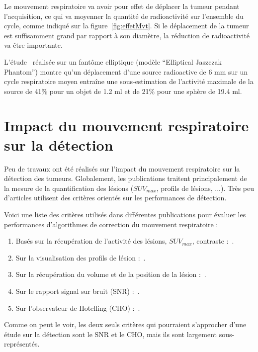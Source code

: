 Le mouvement respiratoire va avoir pour effet de déplacer la tumeur pendant l'acquisition, ce qui va moyenner la quantité de radioactivité sur l'ensemble du cycle, comme indiqué sur la figure~\ref{fig:effetMvt}. Si le déplacement de la tumeur est suffisamment grand par rapport à son diamètre, la réduction de radioactivité va être importante.

L'étude~\cite{boucher2004respiratory} réalisée sur un fantôme elliptique (modèle ``Elliptical Jaszczak Phantom'') montre qu'un déplacement d'une source radioactive de 6 mm sur un cycle respiratoire moyen entraîne une sous-estimation de l'activité maximale de la source de 41\% pour un objet de 1.2 ml et de 21\% pour une sphère de 19.4 ml.


\section{Impact du mouvement respiratoire sur la détection}

Peu de travaux ont été réalisés sur l'impact du mouvement respiratoire sur la détection des tumeurs. Globalement, les publications traitent  principalement de la mesure de la quantification des lésions ($SUV_{max}$, profils de lésions, ...). Très peu d'articles utilisent des critères orientés sur les performances de détection.

Voici une liste des critères utilisés dans différentes publications pour évaluer les performances d'algorithmes de correction du mouvement respiratoire :

\begin{enumerate}
 \item Basés sur la récupération de l'activité des lésions, $SUV_{max}$, contraste :~\cite{GuopingChang2010Implementation,lamare2007list,nehmeh2002effect,detorie2008quantitative}.
 \item Sur la visualisation des profils de lésion :~\cite{GuopingChang2010Implementation,Thielemans2006Lesion,lamare2007list}.
 \item Sur la récupération du volume et de la position de la lésion :~\cite{GuopingChang2010Implementation,lamare2007list,nehmeh2002effect}.
 \item Sur le rapport signal sur bruit (SNR) :~\cite{GuopingChang2010Implementation}.
 \item Sur l'observateur de Hotelling (CHO) :~\cite{Thielemans2006Lesion}.
\end{enumerate}

Comme on peut le voir, les deux seuls critères qui pourraient s'approcher d'une étude sur la détection sont le SNR et le CHO, mais ils sont largement sous-représentés. 


